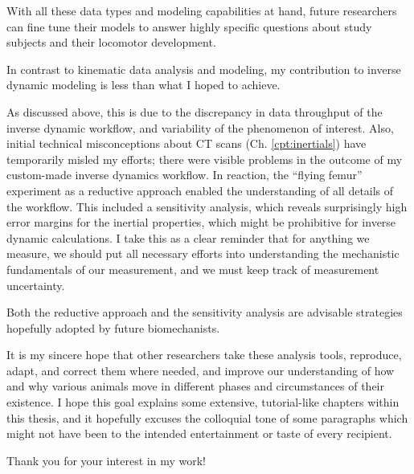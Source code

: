 With all these data types and modeling capabilities at hand, future researchers can fine tune their models to answer highly specific questions about study subjects and their locomotor development.


\bigskip
In contrast to kinematic data analysis and modeling, my contribution to inverse dynamic modeling is less than what I hoped to achieve.

As discussed above, this is due to the discrepancy in data throughput of the inverse dynamic workflow, and variability of the phenomenon of interest.
Also, initial technical misconceptions about CT scans (Ch. \ref{cpt:inertials}) have temporarily misled my efforts; there were visible problems in the outcome of my custom-made inverse dynamics workflow.
In reaction, the ``flying femur'' experiment as a reductive approach enabled the understanding of all details of the workflow.
This included a sensitivity analysis, which reveals surprisingly high error margins for the inertial properties, which might be prohibitive for inverse dynamic calculations.
I take this as a clear reminder that for anything we measure, we should put all necessary efforts into understanding the mechanistic fundamentals of our measurement, and we must keep track of measurement uncertainty.

Both the reductive approach and the sensitivity analysis are advisable strategies hopefully adopted by future biomechanists.

\bigskip
It is my sincere hope that other researchers take these analysis tools, reproduce, adapt, and correct them where needed, and improve our understanding of how and why various animals move in different phases and circumstances of their existence.
I hope this goal explains some extensive, tutorial-like chapters within this thesis, and it hopefully excuses the colloquial tone of some paragraphs which might not have been to the intended entertainment or taste of every recipient.
\bigskip


Thank you for your interest in my work!
